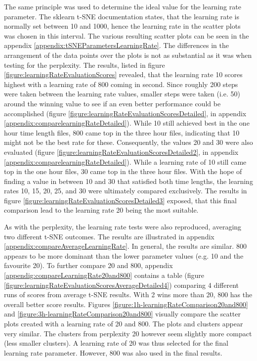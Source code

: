The same principle was used to determine the ideal value for the learning rate parameter. The sklearn t-SNE documentation states, that the learning rate is normally set between 10 and 1000, hence the learning rate in the scatter plots was chosen in this interval.
The various resulting scatter plots can be seen in the appendix \ref{appendix:tSNEParametersLearningRate}. The differences in the arrangement of the data points over the plots is not as substantial as it was when testing for the perplexity. The results, listed in figure \ref{figure:learningRateEvaluationScores} revealed, that the learning rate 10 scores highest with a learning rate of 800 coming in second. Since roughly 200 steps were taken between the learning rate values, smaller steps were taken (i.e. 50) around the winning value to see if an even better performance could be accomplished (figure \ref{figure:learningRateEvaluationScoresDetailed}, in appendix \ref{appendix:comparelearningRateDetailed}). While 10 still achieved best in the one hour time length files, 800 came top in the three hour files, indicating that 10 might not be the best rate for these. Consequently, the values 20 and 30 were also evaluated (figure \ref{figure:learningRateEvaluationScoresDetailed2}, in appendix \ref{appendix:comparelearningRateDetailed}). While a learning rate of 10 still came top in the one hour files, 30 came top in the three hour files. With the hope of finding a value in between 10 and 30 that satisfied both time lengths, the learning rates 10, 15, 20, 25, and 30 were ultimately compared exclusively. The results in figure \ref{figure:learningRateEvaluationScoresDetailed3} exposed, that this final comparison lead to the learning rate 20 being the most suitable. 

As with the perplexity, the learning rate tests were also reproduced, averaging two different t-SNE outcomes. The results are illustrated in appendix \ref{appendix:compareAverageLearningRate}. In general, the results are similar. 800 appears to be more dominant than the lower parameter values (e.g. 10 and the favourite 20). To further compare 20 and 800, appendix \ref{appendig:compareLearningRate20and800} contains a table (figure \ref{figure:learningRateEvaluationScoresAverageDetailed4}) comparing 4 different runs of scores from average t-SNE results. With 2 wins more than 20, 800 has the overall better score results. Figures \ref{figure:1h-learningRateComparison20and800} and \ref{figure:3h-learningRateComparison20and800} visually compare the scatter plots created with a learning rate of 20 and 800. The plots and clusters appear very similar. The clusters from perplexity 20 however seem slightly more compact (less smaller clusters). A learning rate of 20 was thus selected for the final learning rate parameter. However, 800 was also used in the final results.


